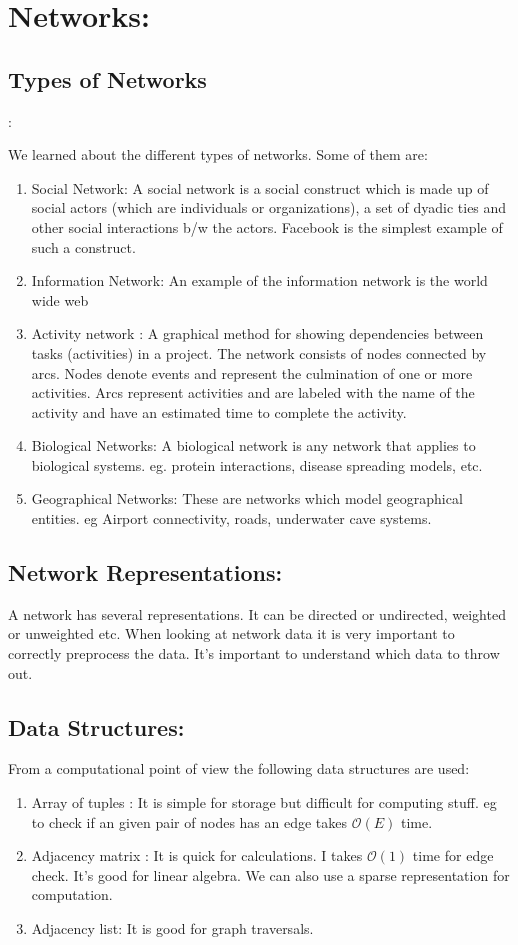 
\section{Networks:}
\subsection{Types of Networks}:

We learned about the different types of networks. Some of them are:
\begin{enumerate}
\item Social Network: A social network is a social construct which is made up of social actors (which are individuals or organizations), a set of dyadic ties and other social interactions b/w the actors. Facebook is the simplest example of such a construct.
\item Information Network: An example of the information network is the world wide web
\item Activity network :  A graphical method for showing dependencies between tasks (activities) in a project. The network consists of nodes connected by arcs. Nodes denote events and represent the culmination of one or more activities. Arcs represent activities and are labeled with the name of the activity and have an estimated time to complete the activity.
\item Biological Networks: A biological network is any network that applies to biological systems. eg. protein interactions, disease spreading models, etc.
\item Geographical Networks: These are networks which model geographical entities. eg Airport connectivity, roads, underwater cave systems.
\end{enumerate}
\subsection{Network Representations:}
A network has several representations. It can be directed or undirected, weighted or unweighted etc. When looking at network data it is very important to correctly preprocess the data. It's important to understand which data to throw out.
\subsection{Data Structures:}
From a computational point of view the following data structures are used:
\begin{enumerate}
\item Array of tuples : It is simple for storage but difficult for computing stuff. eg to check if an given pair of nodes has an edge takes $\mathcal{O}(E)$ time.

\item Adjacency matrix : It is quick for calculations. I takes $\mathcal{O}(1)$ time for edge check. It's good for linear algebra. We can also use a sparse representation for computation.
\item Adjacency list: It is good for graph traversals.
\end{enumerate}
